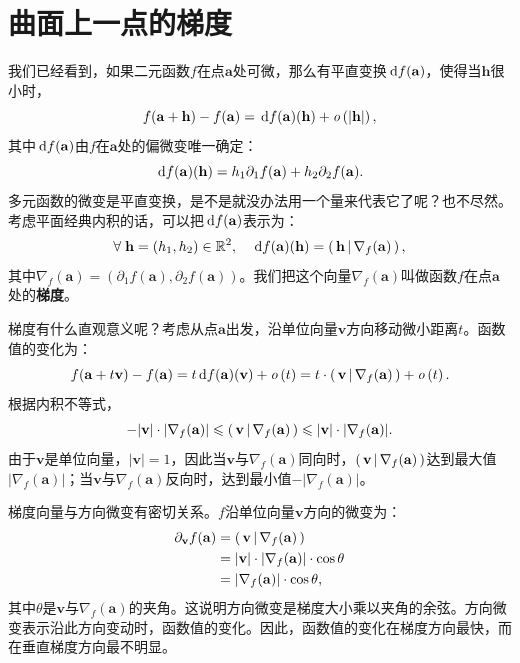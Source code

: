\documentclass[12pt,UTF8,fontset=none]{ctexbook}
\begin{document}
\section{曲面上一点的梯度}
我们已经看到，如果二元函数$f$在点$\mathbf{a}$处可微，那么有平直变换$\,\mathrm{d} f(\mathbf{a})$，使得当$\mathbf{h}$很小时，
$$ f(\mathbf{a} + \mathbf{h}) - f(\mathbf{a}) = \,\mathrm{d} f(\mathbf{a})(\mathbf{h}) + \mathit{o}\left(|\mathbf{h}|\right), $$
其中$\,\mathrm{d} f(\mathbf{a})$由$f$在$\mathbf{a}$处的偏微变唯一确定：
$$ \,\mathrm{d} f(\mathbf{a})(\mathbf{h}) = h_1 \partial_1 f(\mathbf{a}) + h_2 \partial_2 f(\mathbf{a}). $$
多元函数的微变是平直变换，是不是就没办法用一个量来代表它了呢？也不尽然。考虑平面经典内积的话，可以把$\,\mathrm{d} f(\mathbf{a})$表示为：
$$ \forall\; \mathbf{h} = (h_1, h_2)\in \mathbb{R}^2, \quad \,\mathrm{d} f(\mathbf{a})(\mathbf{h}) = \displaystyle\left( \,\mathbf{h} \,\middle\vert \,\nabla_f(\mathbf{a}) \,\right), $$
其中$\nabla_f(\mathbf{a}) = (\partial_1 f(\mathbf{a}), \partial_2 f(\mathbf{a}))$。我们把这个向量$\nabla_f(\mathbf{a})$叫做函数$f$在点$\mathbf{a}$处的\textbf{梯度}。

梯度有什么直观意义呢？考虑从点$\mathbf{a}$出发，沿单位向量$\mathbf{v}$方向移动微小距离$t$。函数值的变化为：
$$ f(\mathbf{a} + t \mathbf{v}) - f(\mathbf{a}) = t \,\mathrm{d} f(\mathbf{a})(\mathbf{v}) + \mathit{o}\left(t\right) = t \cdot \displaystyle\left( \,\mathbf{v} \,\middle\vert \,\nabla_f(\mathbf{a}) \,\right)  + \mathit{o}\left(t\right). $$
根据内积不等式，
$$ -|\mathbf{v}|\cdot |\nabla_f(\mathbf{a})| \leqslant \displaystyle\left( \,\mathbf{v} \,\middle\vert \,\nabla_f(\mathbf{a}) \,\right) \leqslant |\mathbf{v}|\cdot |\nabla_f(\mathbf{a})|. $$
由于$\mathbf{v}$是单位向量，$|\mathbf{v}| = 1$，因此当$\mathbf{v}$与$\nabla_f(\mathbf{a})$同向时，$\displaystyle\left( \,\mathbf{v} \,\middle\vert \,\nabla_f(\mathbf{a}) \,\right)$达到最大值$|\nabla_f(\mathbf{a})|$；当$\mathbf{v}$与$\nabla_f(\mathbf{a})$反向时，达到最小值$-|\nabla_f(\mathbf{a})|$。

梯度向量与方向微变有密切关系。$f$沿单位向量$\mathbf{v}$方向的微变为：
\begin{align*}
\partial_{\mathbf{v}} f(\mathbf{a}) &= \displaystyle\left( \,\mathbf{v} \,\middle\vert \,\nabla_f(\mathbf{a}) \,\right) \\
&= |\mathbf{v}|\cdot |\nabla_f(\mathbf{a})| \cdot \cos\theta \\
&= |\nabla_f(\mathbf{a})| \cdot \cos\theta,
\end{align*}
其中$\theta$是$\mathbf{v}$与$\nabla_f(\mathbf{a})$的夹角。这说明方向微变是梯度大小乘以夹角的余弦。方向微变表示沿此方向变动时，函数值的变化。因此，函数值的变化在梯度方向最快，而在垂直梯度方向最不明显。
\end{document}
